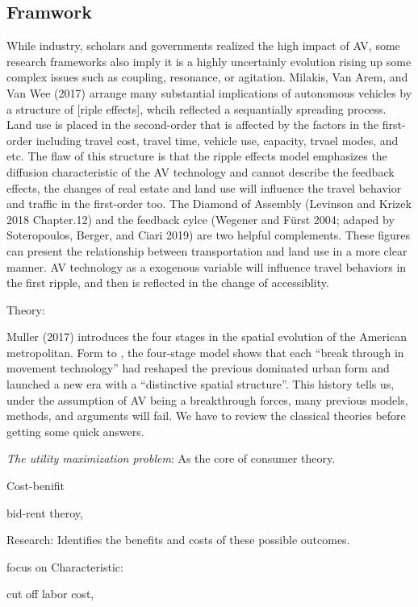 \documentclass[12pt,]{article}
\begin{document}
\hypertarget{framwork}{%
\subsection{Framwork}\label{framwork}}

While industry, scholars and governments realized the high impact of AV,
some research frameworks also imply it is a highly uncertainly evolution
rising up some complex issues such as coupling, resonance, or agitation.
Milakis, Van Arem, and Van Wee (2017) arrange many substantial
implications of autonomous vehicles by a structure of {[}riple
effects{]}, whcih reflected a sequantially spreading process. Land use
is placed in the second-order that is affected by the factors in the
first-order including travel cost, travel time, vehicle use, capacity,
trvael modes, and etc. The flaw of this structure is that the ripple
effects model emphasizes the diffusion characteristic of the AV
technology and cannot describe the feedback effects, the changes of real
estate and land use will influence the travel behavior and traffic in
the first-order too. The Diamond of Assembly (Levinson and Krizek 2018
Chapter.12) and the feedback cylce (Wegener and Fürst 2004; adaped by
Soteropoulos, Berger, and Ciari 2019) are two helpful complements. These
figures can present the relationship between transportation and land use
in a more clear manner. AV technology as a exogenous variable will
influence travel behaviors in the first ripple, and then is reflected in
the change of accessiblity.

Theory:

Muller (2017) introduces the four stages in the spatial evolution of the
American metropolitan. Form to , the four-stage model shows that each
``break through in movement technology'' had reshaped the previous
dominated urban form and launched a new era with a ``distinctive spatial
structure''. This history tells us, under the assumption of AV being a
breakthrough forces, many previous models, methods, and arguments will
fail. We have to review the classical theories before getting some quick
answers.

\emph{The utility maximization problem}: As the core of consumer theory.

Cost-benifit

bid-rent theroy,

Research: Identifies the benefits and costs of these possible outcomes.

focus on Characteristic:

cut off labor cost,
\end{document}
